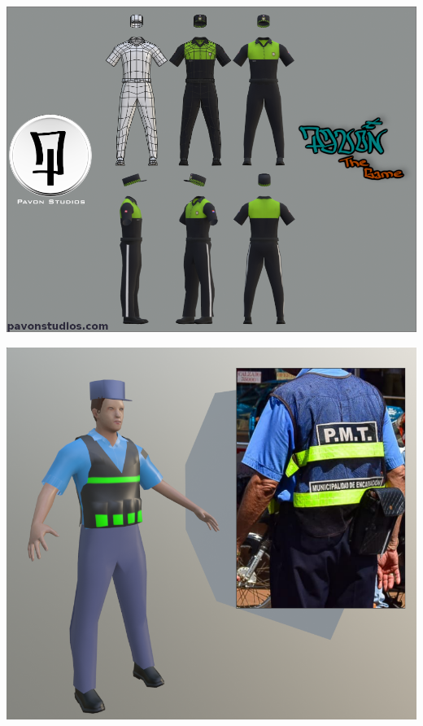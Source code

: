 \documentclass{article}
\begin{document}
  \includegraphics[width=\textwidth]{79.png}

  \includegraphics[width=\textwidth]{80.png}
\end{document}
